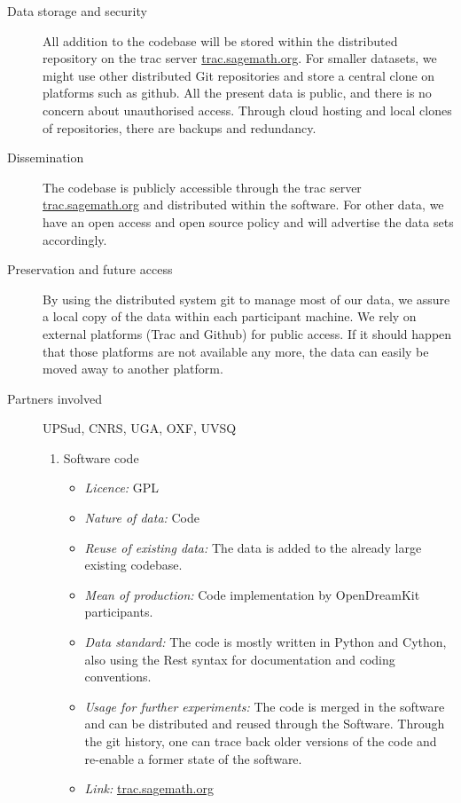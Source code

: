 \documentclass{deliverablereport}
\begin{document}
\begin{description}
\item[Data storage and security] All addition to the \Sage codebase will be stored within the distributed \Sage repository on the trac server \href{http://trac.sagemath.org/}{trac.sagemath.org}. For smaller datasets, we might use other distributed Git repositories and store a central clone on platforms such as github. All the present data is public, and there is no concern about
unauthorised access. Through cloud hosting and local clones of
repositories, there are backups and redundancy.
\label{Sagesec}
\item[Dissemination] The \Sage codebase is publicly accessible through
  the trac server \href{http://trac.sagemath.org/}{trac.sagemath.org}
  and distributed within the \Sage software. For other data, we have an open access and open source policy and will advertise the data sets accordingly.
\label{Sagediss}
\item[Preservation and future access] By using the distributed system git to manage most of our data, we assure a local copy of the data within each participant machine. We rely on external platforms (Trac and Github) for public access. If it should happen that those platforms are not available any more, the data can easily be moved away to another platform.
\item[Partners involved] UPSud, CNRS, UGA, OXF, UVSQ
\label{Sagepres}


\begin{enumerate}
\item{Software code}
\begin{itemize}
\item\textit{Licence:} GPL
\item\textit{Nature of data:} Code
\item\textit{Reuse of existing data:} The data is added to the already large existing \Sage codebase.
\item\textit{Mean of production:} Code implementation by OpenDreamKit participants.
\item\textit{Data standard:} The code is mostly written in Python and Cython, also using the Rest syntax for documentation and \Sage coding conventions.
\item\textit{Usage for further experiments:} The code is merged in the software and can be distributed and reused through the Software. Through the git history,
one can trace back older versions of the code and re-enable a former state of the software.
\item\textit{Link:} \href{http://trac.sagemath.org/}{trac.sagemath.org}


\end{itemize}
\end{enumerate}
\end{description}
\end{document}
